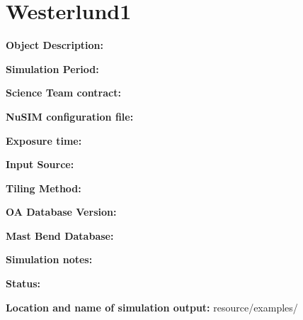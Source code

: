 
\newpage

\section{Westerlund1}

\textbf{Object Description:}

\textbf{Simulation Period:} 

\textbf{Science Team contract:} 

\textbf{NuSIM configuration file:}

\textbf{Exposure time:}

\textbf{Input Source:} 

\textbf{Tiling Method:}

\textbf{OA Database Version:} 

\textbf{Mast Bend Database:} 

\textbf{Simulation notes:} 

\textbf{Status:} 

\textbf{Location and name of simulation output:} resource/examples/


